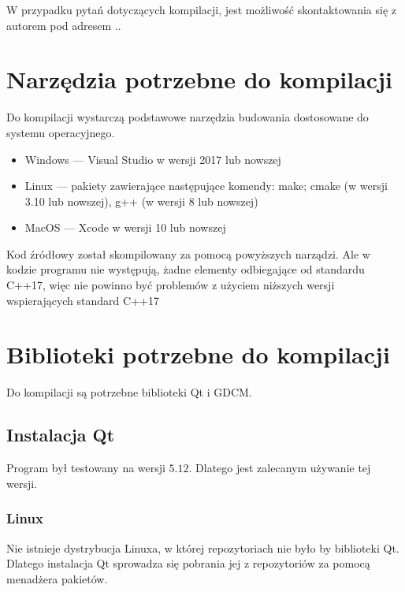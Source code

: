 


W przypadku pytań dotyczących kompilacji, jest możliwość skontaktowania się z autorem pod adresem \mailToMe..

\section{Narzędzia potrzebne do kompilacji}

\par
Do kompilacji wystarczą podstawowe narzędzia budowania dostosowane do systemu operacyjnego.

\begin{itemize}
    \item Windows --- Visual Studio w wersji 2017 lub nowszej
    \item Linux --- pakiety zawierające następujące komendy: make; cmake (w wersji 3.10 lub nowszej), g++ (w wersji 8 lub nowszej)
    \item MacOS --- Xcode w wersji 10 lub nowszej
\end{itemize}

Kod źródłowy został skompilowany za pomocą powyższych narządzi.
Ale w kodzie programu nie występują, żadne elementy odbiegające od standardu C++17, więc nie powinno być problemów z użyciem niższych wersji wspierających standard C++17

\section{Biblioteki potrzebne do kompilacji}

Do kompilacji są potrzebne biblioteki Qt i GDCM.

\subsection{Instalacja Qt}

Program był testowany na wersji $5.12$.
Dlatego jest zalecanym używanie tej wersji.

\subsubsection*{Linux}

Nie istnieje dystrybucja Linuxa, w której repozytoriach nie było by biblioteki Qt.
Dlatego instalacja Qt sprowadza się pobrania jej z repozytoriów za pomocą menadżera pakietów.

